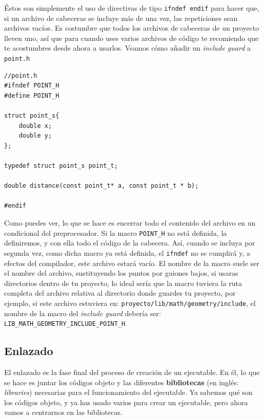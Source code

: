 \documentclass[a4paper]{article}
\begin{document}
Éstos son simplemente el uso de directivas de tipo \verb!ifndef endif! para
hacer que, si un archivo de cabeceras se incluye más de una vez, las
repeticiones sean archivos vacíos. Es costumbre que todos los archivos
de cabeceras de un proyecto lleven uno, así que para cuando uses varios
archivos de código te recomiendo que te acostumbres desde ahora a usarlos.
Veamos cómo añadir un \emph{include guard} a \verb!point.h!


\noindent
\begin{minipage}[H]{\linewidth}
\mbox{}
\begin{lstlisting}[style=C,
caption={Ejemplo de \emph{include guard}},
label={lst:includeGuard}]
//point.h
#ifndef POINT_H
#define POINT_H

struct point_s{
    double x;
    double y;
};

typedef struct point_s point_t;

double distance(const point_t* a, const point_t * b);

#endif
\end{lstlisting}
\end{minipage}

Como puedes ver, lo que se hace es encerrar todo el contenido del archivo
en un condicional del preprocesador.
Si la macro \verb!POINT_H! no está definida, la definiremos,
y con ella todo el código de la cabecera. Así, cuando se incluya por segunda
vez, como dicha macro ya está definida, el \verb!ifndef! no se cumplirá y,
a efectos del compilador, este archivo estará vacío. El nombre de la macro
suele ser el nombre del archivo, sustituyendo los puntos por guiones bajos,
si usaras directorios dentro de tu proyecto, lo ideal sería que la macro tuviera
la ruta completa del archivo relativa al directorio donde guardes tu proyecto,
por ejemplo, si este archivo estuviera en:
\verb!proyecto/lib/math/geometry/include!, el nombre de la macro del
\emph{include guard} debería ser:
\verb!LIB_MATH_GEOMETRY_INCLUDE_POINT_H!.


\subsection{Enlazado}
El enlazado es la fase final del proceso de creación de un ejecutable. En él,
lo que se hace es juntar los códigos objeto y las diferentes
\textbf{bibliotecas} (en inglés: \textit{libraries})
necesarias para el funcionamiento del ejecutable. Ya
sabemos qué son los códigos objeto, y ya has usado varios para crear un
ejecutable, pero ahora vamos a centrarnos en las bibliotecas.
\end{document}
